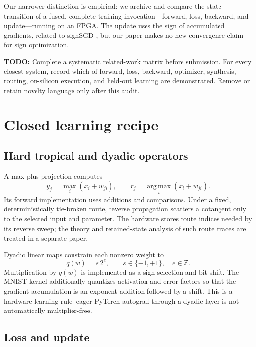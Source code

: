 \documentclass[10pt]{article}
\newcommand{\todo}[1]{\textcolor{red!70!black}{\textbf{TODO:} #1}}
\begin{document}
Our narrower distinction is empirical: we archive and compare the state
transition of a fused, complete training invocation---forward, loss, backward,
and update---running on an FPGA.  The update uses the sign of accumulated
gradients, related to signSGD \cite{bernstein2018signsgd}, but our paper makes no
new convergence claim for sign optimization.

\todo{Complete a systematic related-work matrix before submission.  For every
closest system, record which of forward, loss, backward, optimizer, synthesis,
routing, on-silicon execution, and held-out learning are demonstrated.  Remove
or retain novelty language only after this audit.}

\section{Closed learning recipe}

\subsection{Hard tropical and dyadic operators}

A max-plus projection computes
\begin{equation}
  y_j = \max_i \left(x_i + w_{ji}\right), \qquad
  r_j = \operatorname*{arg\,max}_i \left(x_i + w_{ji}\right).
\end{equation}
Its forward implementation uses additions and comparisons.  Under a fixed,
deterministically tie-broken route, reverse propagation scatters a cotangent
only to the selected input and parameter.  The hardware stores route indices
needed by its reverse sweep; the theory and retained-state analysis of such
route traces are treated in a separate paper.

Dyadic linear maps constrain each nonzero weight to
\begin{equation}
  q(w) = s\,2^e, \qquad s\in\{-1,+1\},\quad e\in\mathbb{Z}.
\end{equation}
Multiplication by $q(w)$ is implemented as a sign selection and bit shift.
The MNIST kernel additionally quantizes activation and error factors so that
the gradient accumulation is an exponent addition followed by a shift.  This
is a hardware learning rule; eager PyTorch autograd through a dyadic layer is
not automatically multiplier-free.

\subsection{Loss and update}
\end{document}
